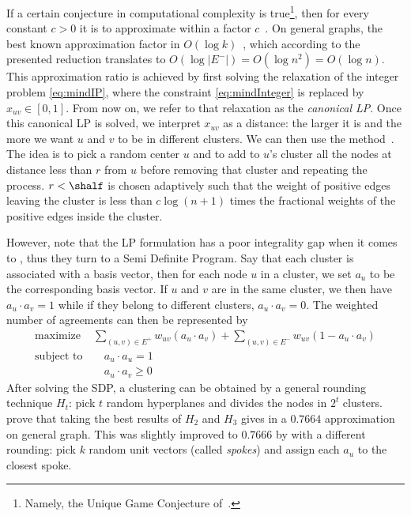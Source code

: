 If a certain conjecture in computational complexity is true\footnote{Namely, the Unique Game
Conjecture of~\textcite{UGC02}.}, then for every constant $c>0$ it is \NPh{} to approximate \mmc{}
within a factor $c$~\autocite{}. On general graphs, the best known approximation factor in $O(\log
k)$~\autocite{RegionGrowing93}, which according to the presented reduction translates to
$O(\log|E^-|)=O(\log n^2)=O(\log n)$. This approximation ratio is achieved by first solving the
relaxation of the integer problem \eqref{eq:mindIP}, where the constraint \eqref{eq:mindInteger} is
replaced by $x_{uv}\in [0,1]$. From now on, we refer to that relaxation as the \emph{canonical
\mind{} LP}. Once this canonical \mind{} LP is solved, we interpret $x_{uv}$ as a distance: the
larger it is and the more we want $u$ and $v$ to be in different clusters. We can then use the
\regionGrow{} method~\autocite{RegionGrowing93}. The idea is to pick a random center $u$ and to add
to $u$'s cluster all the nodes at distance less than $r$ from $u$ before removing that cluster and
repeating the process. $r<\shalf$ is chosen adaptively such that the weight of positive edges
leaving the cluster is less than $c\log(n+1)$ times the fractional weights of the positive edges
inside the cluster.

However, \textcite[Theorem 2]{Charikar2003} note that the LP formulation has a poor integrality gap
when it comes to \maxa{}, thus they turn to a Semi Definite Program. Say that each cluster is
associated with a basis vector, then for each node $u$ in a cluster, we set $a_u$ to be the
corresponding basis vector. If $u$ and $v$ are in the same cluster, we then have $a_u\cdot a_v = 1$
while if they belong to different clusters, $a_u\cdot a_v = 0$. The weighted number of agreements
can then be represented by
\begin{align}
   \label{eq:maxaSDP}
   \text{maximize } & \sum_{(u,v)\in E^+} w_{uv}(a_u\cdot a_v) + \sum_{(u,v)\in E^-} w_{uv}(1-a_u\cdot a_v) \\
   \text{subject to}& \quad a_u\cdot a_u=1 \nonumber\\
   \phantom{subject to}& \quad a_u\cdot a_v\geq 0  \nonumber
\end{align}
After solving the SDP, a clustering can be obtained by a general rounding technique $H_t$: pick $t$
random hyperplanes and divides the nodes in $2^t$ clusters. \Textcite[Theorem 3]{Charikar2003} prove
that taking the best results of $H_2$ and $H_3$ gives in a $0.7664$ approximation on general graph.
This was slightly improved to $0.7666$ by \textcite{Swamy2004} with a different rounding: pick $k$
random unit vectors (called \emph{spokes}) and assign each $a_u$ to the closest spoke.


